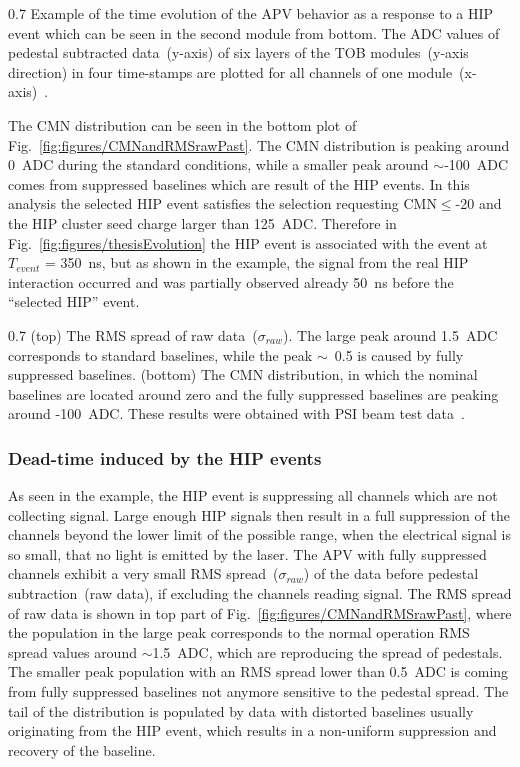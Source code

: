                  {0.7}       %
                 {Example of the time evolution of the APV behavior as a response to a HIP event which can be seen in the second module from bottom. The ADC values of pedestal subtracted data~(y-axis) of six layers of the TOB modules~(y-axis direction) in four time-stamps are plotted for all channels of one module~(x-axis)~\cite{Bainbridge:2004jc}.} %

The CMN distribution can be seen in the bottom plot of Fig.~\ref{fig:figures/CMNandRMSrawPast}. The CMN distribution is peaking around 0~ADC during the standard conditions, while a smaller peak around $\sim$-100~ADC comes from suppressed baselines which are result of the HIP events. In this analysis the selected HIP event satisfies the selection requesting CMN$\leq$-20 and the HIP cluster seed charge larger than 125~ADC. Therefore in Fig.~\ref{fig:figures/thesisEvolution} the HIP event is associated with the event at $T_{event}$ = 350~ns, but as shown in the example, the signal from the real HIP interaction occurred and was partially observed already 50~ns before the ``selected HIP'' event.

                 {0.7}       %
                 {(top) The RMS spread of raw data~($\sigma_{raw}$). The large peak around 1.5~ADC corresponds to standard baselines, while the peak $\sim$~0.5 is caused by fully suppressed baselines. (bottom) The CMN distribution, in which the nominal baselines are located around zero and the fully suppressed baselines are peaking around -100~ADC. These results were obtained with PSI beam test data~\cite{Bainbridge:2004jc}.} %



\subsubsection{Dead-time induced by the HIP events~\label{sec:deadtimePast}}

As seen in the example, the HIP event is suppressing all channels which are not collecting signal. Large enough HIP signals then result in a full suppression of the channels beyond the lower limit of the possible range, when the electrical signal is so small, that no light is emitted by the laser. The APV with fully suppressed channels exhibit a very small RMS spread~($\sigma_{raw}$) of the data before pedestal subtraction~(raw data), if excluding the channels reading signal. The RMS spread of raw data is shown in top part of Fig.~\ref{fig:figures/CMNandRMSrawPast}, where the population in the large peak corresponds to the normal operation RMS spread values around $\sim$1.5~ADC, which are reproducing the spread of pedestals. The smaller peak population with an RMS spread lower than 0.5~ADC is coming from fully suppressed baselines not anymore sensitive to the pedestal spread. The tail of the distribution is populated by data with distorted baselines usually originating from the HIP event, which results in a non-uniform suppression and recovery of the baseline.


